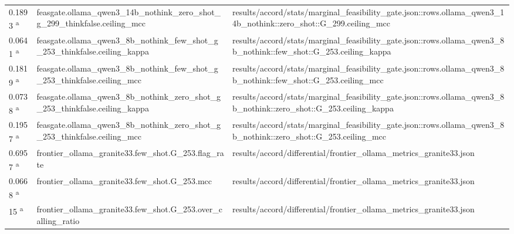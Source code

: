 \begin{longtable}{@{}p{0.7in}p{1.9in}p{2.6in}@{}}
0.1893 \textsuperscript{a} & feasgate.\allowbreak{}ollama\_qwen3\_14b\_nothink\_zero\_shot\_g\_299\_thinkfalse.\allowbreak{}ceiling\_mcc & results/\allowbreak{}accord/\allowbreak{}stats/\allowbreak{}marginal\_feasibility\_gate.\allowbreak{}json::rows.\allowbreak{}ollama\_qwen3\_14b\_nothink::zero\_shot::G\_299.\allowbreak{}ceiling\_mcc\\
0.0641 \textsuperscript{a} & feasgate.\allowbreak{}ollama\_qwen3\_8b\_nothink\_few\_shot\_g\_253\_thinkfalse.\allowbreak{}ceiling\_kappa & results/\allowbreak{}accord/\allowbreak{}stats/\allowbreak{}marginal\_feasibility\_gate.\allowbreak{}json::rows.\allowbreak{}ollama\_qwen3\_8b\_nothink::few\_shot::G\_253.\allowbreak{}ceiling\_kappa\\
0.1819 \textsuperscript{a} & feasgate.\allowbreak{}ollama\_qwen3\_8b\_nothink\_few\_shot\_g\_253\_thinkfalse.\allowbreak{}ceiling\_mcc & results/\allowbreak{}accord/\allowbreak{}stats/\allowbreak{}marginal\_feasibility\_gate.\allowbreak{}json::rows.\allowbreak{}ollama\_qwen3\_8b\_nothink::few\_shot::G\_253.\allowbreak{}ceiling\_mcc\\
0.0738 \textsuperscript{a} & feasgate.\allowbreak{}ollama\_qwen3\_8b\_nothink\_zero\_shot\_g\_253\_thinkfalse.\allowbreak{}ceiling\_kappa & results/\allowbreak{}accord/\allowbreak{}stats/\allowbreak{}marginal\_feasibility\_gate.\allowbreak{}json::rows.\allowbreak{}ollama\_qwen3\_8b\_nothink::zero\_shot::G\_253.\allowbreak{}ceiling\_kappa\\
0.1957 \textsuperscript{a} & feasgate.\allowbreak{}ollama\_qwen3\_8b\_nothink\_zero\_shot\_g\_253\_thinkfalse.\allowbreak{}ceiling\_mcc & results/\allowbreak{}accord/\allowbreak{}stats/\allowbreak{}marginal\_feasibility\_gate.\allowbreak{}json::rows.\allowbreak{}ollama\_qwen3\_8b\_nothink::zero\_shot::G\_253.\allowbreak{}ceiling\_mcc\\
0.6957 \textsuperscript{a} & frontier\_ollama\_granite33.\allowbreak{}few\_shot.\allowbreak{}G\_253.\allowbreak{}flag\_rate & results/\allowbreak{}accord/\allowbreak{}differential/\allowbreak{}frontier\_ollama\_metrics\_granite33.\allowbreak{}json\\
0.0668 \textsuperscript{a} & frontier\_ollama\_granite33.\allowbreak{}few\_shot.\allowbreak{}G\_253.\allowbreak{}mcc & results/\allowbreak{}accord/\allowbreak{}differential/\allowbreak{}frontier\_ollama\_metrics\_granite33.\allowbreak{}json\\
15 \textsuperscript{a} & frontier\_ollama\_granite33.\allowbreak{}few\_shot.\allowbreak{}G\_253.\allowbreak{}over\_calling\_ratio & results/\allowbreak{}accord/\allowbreak{}differential/\allowbreak{}frontier\_ollama\_metrics\_granite33.\allowbreak{}json\\

\end{longtable}
